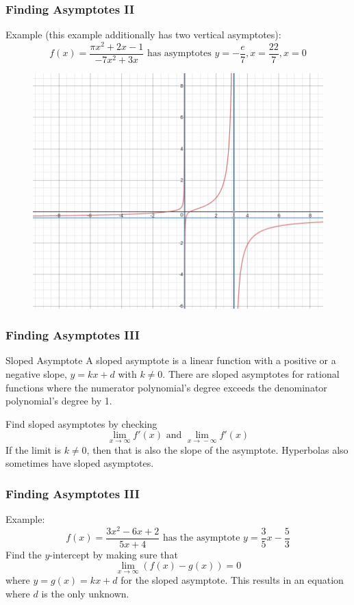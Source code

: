 \documentclass[xcolor=dvipsnames]{beamer}
\begin{document}
\begin{frame}
  \frametitle{Finding Asymptotes II}
Example (this example additionally has two
  vertical asymptotes):
\begin{equation}
  \label{eq:ahyoimij}
  f(x)=\frac{\pi{}x^{2}+2x-1}{-7x^{2}+3x}\mbox{ has asymptotes }y=-\frac{e}{7},x=\frac{22}{7},x=0
\end{equation}
\begin{figure}[h]
\includegraphics[scale=.25]{./diagrams/asymp4.png}
\end{figure}
\end{frame}

\begin{frame}
  \frametitle{Finding Asymptotes III}
\begin{block}{Sloped Asymptote}
  A sloped asymptote is a linear function with a positive or a
  negative slope, $y=kx+d$ with $k\neq{}0$. There are sloped
  asymptotes for rational functions where the numerator polynomial's
  degree exceeds the denominator polynomial's degree by 1.
\end{block}
Find sloped asymptotes by checking
\begin{equation}
  \label{eq:uzuwooba}
  \lim_{x\rightarrow\infty}f'(x)\mbox{ and }\lim_{x\rightarrow{}-\infty}f'(x)
\end{equation}
If the limit is $k\neq{}0$, then that is also the slope of the
asymptote. Hyperbolas also sometimes have sloped asymptotes. 
\end{frame}

\begin{frame}
  \frametitle{Finding Asymptotes III}
Example:
\begin{equation}
  \label{eq:iboohoht}
  f(x)=\frac{3x^{2}-6x+2}{5x+4}\mbox{ has the asymptote }y=\frac{3}{5}x-\frac{5}{3}
\end{equation}
Find the $y$-intercept by making sure that
\begin{equation}
  \label{eq:roojogai}
  \lim_{x\rightarrow\infty}\left(f(x)-g(x)\right)=0
\end{equation}
where $y=g(x)=kx+d$ for the sloped asymptote. This results in an
equation where $d$ is the only unknown.
\end{frame}
\end{document}
